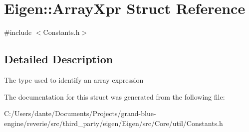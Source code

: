 \hypertarget{struct_eigen_1_1_array_xpr}{}\section{Eigen\+::Array\+Xpr Struct Reference}
\label{struct_eigen_1_1_array_xpr}


{\ttfamily \#include $<$Constants.\+h$>$}



\subsection{Detailed Description}
The type used to identify an array expression 

The documentation for this struct was generated from the following file\+:\begin{DoxyCompactItemize}
\item 
C\+:/\+Users/dante/\+Documents/\+Projects/grand-\/blue-\/engine/reverie/src/third\+\_\+party/eigen/\+Eigen/src/\+Core/util/Constants.\+h\end{DoxyCompactItemize}
